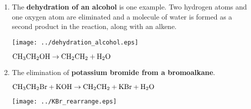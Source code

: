 \begin{enumerate}
\item{
The \textbf{dehydration of an alcohol} is one example. Two hydrogen atoms and one oxygen atom are eliminated and a molecule of water is formed as a second product in the reaction, along with an alkene. \\

\begin{center}
 \texttt{[image: ../dehydration\_alcohol.eps]}
\end{center}


 \begin{center}
 $\rm{CH_{3}CH_{2}OH \rightarrow CH_{2}CH_{2} + H_{2}O}$
 \end{center}
 
% 
}

\item{The elimination of \textbf{potassium bromide from a bromoalkane}. 

\begin{center}
$\rm{CH_{3}CH_{2}Br + KOH \rightarrow CH_{2}CH_{2} + KBr + H_{2}O}$
\end{center}

\begin{center}
 \texttt{[image: ../KBr\_rearrange.eps]}
\end{center}


}
\end{enumerate}
